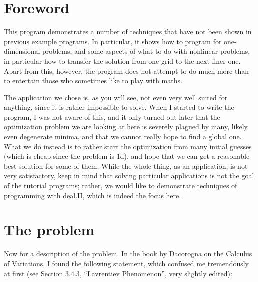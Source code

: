 \documentclass{article}
\begin{document}
\section{Foreword}

This program demonstrates a number of techniques that have not been shown in
previous example programs. In particular, it shows how to program for
one-dimensional problems, and some aspects of what to do with nonlinear
problems, in particular how to transfer the solution from one grid to the next
finer one. Apart from this, however, the program does not attempt to do much
more than to entertain those who sometimes like to play with maths.

The application we chose is, as you will see, not even very well suited for
anything, since it is rather impossible to solve. When I started to write the
program, I was not aware of this, and it only turned out later that the
optimization problem we are looking at here is severely plagued by many,
likely even degenerate minima, and that we cannot really hope to find a global
one. What we do instead is to rather start the optimization from many initial
guesses (which is cheap since the problem is 1d), and hope that we can get a
reasonable best solution for some of them. While the whole thing, as an
application, is not very satisfactory, keep in mind that solving particular
applications is not the goal of the tutorial programs; rather, we would like
to demonstrate techniques of programming with deal.II, which is indeed the
focus here.


\section{The problem}

Now for a description of the problem.  In the book by Dacorogna on the
Calculus of Variations, I found the following statement, which confused me
tremendously at first (see Section 3.4.3, ``Lavrentiev Phenomenon'', very
slightly edited):
\end{document}
